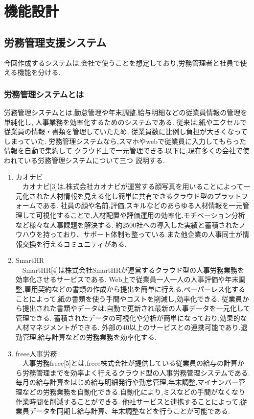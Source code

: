 \chapter{機能設計}
\label{chp:chart}

\section{労務管理支援システム}
\label{sec:chart_figure}
今回作成するシステムは,会社で使うことを想定しており,労務管理者と社員で使える機能を分ける.

\subsection{労務管理システムとは}
労務管理システムとは,勤怠管理や年末調整,給与明細などの従業員情報の管理を単純化し,
人事業務を効率化するためのシステムである.
従来は,紙やエクセルで従業員の情報・書類を管理していたため,
従業員数に比例し負担が大きくなってしまっていた.
労務管理システムなら,スマホやwebで従業員に入力してもらった情報を自動で集約して
クラウド上で一元管理できる.以下に,現在多くの会社で使われている労務管理システムについて三つ
説明する.

\renewcommand{\labelenumi}{(\arabic{enumi})}

\begin{enumerate}
  \item カオナビ \\
  　カオナビ[3]は,株式会社カオナビが運営する顔写真を用いることによって一元化された人材情報を見える化し簡単に共有できるクラウド型のプラットフォームである.
  社員の顔や名前,評価,スキルなどのあらゆる人材情報を一元管理して可視化することで,人材配置や評価運用の効率化,モチベーション分析など様々な人事課題を解決する.
  約2500社への導入した実績と蓄積されたノウハウを持っており、サポート体制も整っている.また他企業の人事同士が情報交換を行えるコミュニティがある.\\

  \item SmartHR\\
  　SmartHR[4]は株式会社SmartHRが運営するクラウド型の人事労務業務を効率化させるサービスである.
  Web上で従業員一人一人の人事評価や年末調整,雇用契約などの書類の作成から提出を簡単に行える.ペーパーレス化することによって,紙の書類を使う手間やコストを削減し,効率化できる.
  従業員から提出された書類やデータは,自動で更新され最新の人事データを一元化して管理できる.
  蓄積されたデータの可視化や分析が簡単になっており,効果的な人材マネジメントができる.
  外部の40以上のサービスとの連携可能であり,退勤管理,給与計算などの労務業務を効率化する. \\

  \item freee人事労務\\
  　人事労務freee[5]とは,freee株式会社が提供している従業員の給与の計算から労務管理までを効率よく行えるクラウド型の人事労務管理システムである.
毎月の給与計算をはじめ給与明細発行や勤怠管理,年末調整,マイナンバー管理などの労務業務を自動化できる.自動化により,ミスなどの手間がなくなり作業時間を削減することができる.
他社サービスと連携することによって,従業員データを同期し給与計算、年末調整などを行うことが可能である.
\end{enumerate}

